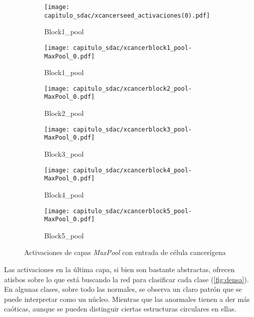  \begin{figure}[] %
    \begin{subfigure}{0.450\textwidth}
      \texttt{[image: capitulo\_sdac/xcancerseed\_activaciones(0).pdf]}
      \caption{Block1\_pool}\label{fig:ay}
    \end{subfigure}\hspace*{\fill}
    \begin{subfigure}{0.450\textwidth}
      \texttt{[image: capitulo\_sdac/xcancerblock1\_pool-MaxPool\_0.pdf]}
      \caption{Block1\_pool}\label{fig:by}
    \end{subfigure}
    
    \medskip
    \begin{subfigure}{0.450\textwidth}
      \texttt{[image: capitulo\_sdac/xcancerblock2\_pool-MaxPool\_0.pdf]}
      \caption{Block2\_pool}\label{fig:cy}
    \end{subfigure}\hspace*{\fill}
    \begin{subfigure}{0.450\textwidth}
      \texttt{[image: capitulo\_sdac/xcancerblock3\_pool-MaxPool\_0.pdf]}
      \caption{Block3\_pool}\label{fig:dy}
    \end{subfigure}
    
    \medskip
    \begin{subfigure}{0.450\textwidth}
      \texttt{[image: capitulo\_sdac/xcancerblock4\_pool-MaxPool\_0.pdf]}
      \caption{Block4\_pool}\label{fig:ey}
    \end{subfigure}\hspace*{\fill}
    \begin{subfigure}{0.450\textwidth}
      \texttt{[image: capitulo\_sdac/xcancerblock5\_pool-MaxPool\_0.pdf]}
      \caption{Block5\_pool}\label{fig:fy}
    \end{subfigure}
    \caption{Activaciones de capas \emph{MaxPool} con entrada de célula cancerígena}\label{fig:inter}
    \end{figure}

Las activaciones en la última capa, si bien son bastante abstractas, ofrecen
atisbos sobre lo que está buscando la red para clasificar cada clase
(\autoref{fig:densa}). En algunas clases, sobre todo las normales, se observa un
claro patrón que se puede interpretar como un núcleo. Mientras que las anormales
tienen a der más caóticas, aunque se pueden distinguir ciertas estructuras
circulares en ellas.

